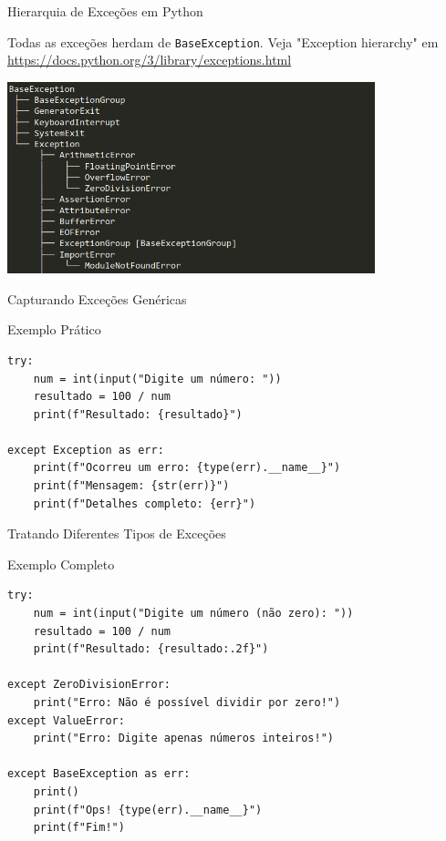 \begin{frame}{Hierarquia de Exceções em Python}
    \begin{block}{}
        \small
        Todas as exceções herdam de \texttt{BaseException}. Veja "Exception hierarchy" em \url{https://docs.python.org/3/library/exceptions.html}
    \end{block}

    \begin{center}
        \includegraphics[width=0.8\textwidth]{Images/python_exception_hierarchy.png}
    \end{center}


\end{frame}


\begin{frame}[fragile]{Capturando Exceções Genéricas}
    \begin{block}{Exemplo Prático}
        \begin{verbatim}
try:
    num = int(input("Digite um número: "))
    resultado = 100 / num
    print(f"Resultado: {resultado}")
    
except Exception as err:  
    print(f"Ocorreu um erro: {type(err).__name__}")
    print(f"Mensagem: {str(err)}")
    print(f"Detalhes completo: {err}")
\end{verbatim}
    \end{block}
\end{frame}

\begin{frame}[fragile]{Tratando Diferentes Tipos de Exceções}
    \begin{block}{Exemplo Completo}
        \begin{verbatim}
try:
    num = int(input("Digite um número (não zero): "))
    resultado = 100 / num
    print(f"Resultado: {resultado:.2f}")

except ZeroDivisionError:
    print("Erro: Não é possível dividir por zero!")
except ValueError:
    print("Erro: Digite apenas números inteiros!")

except BaseException as err:
    print()
    print(f"Ops! {type(err).__name__}")
    print(f"Fim!")
\end{verbatim}
    \end{block}

\end{frame}


